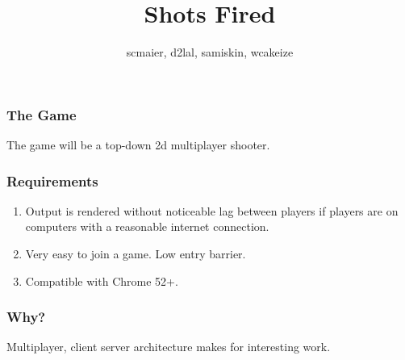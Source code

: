 \documentclass{slides}
\title{Shots Fired}
\author{scmaier, d2lal, samiskin, wcakeize}
\begin{document}
\begin{frame}
\frametitle{The Game}
The game will be a top-down 2d multiplayer shooter.
\end{frame}

\begin{frame}
\frametitle{Requirements}

\begin{enumerate}
\item Output is rendered without noticeable lag between players if players are on computers with a reasonable internet connection. 
\item Very easy to join a game. Low entry barrier. 
\item Compatible with Chrome 52+.
\end{enumerate}

\end{frame}

\begin{frame}
\frametitle{Why?}
Multiplayer, client server architecture makes for interesting work.

\end{frame}
\end{document}
